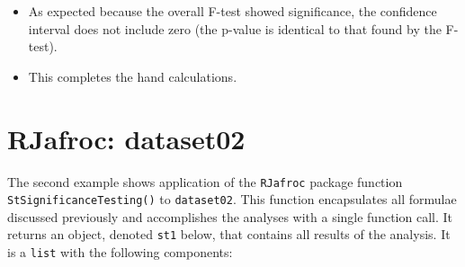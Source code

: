 \documentclass[
]{book}
\providecommand{\tightlist}{%
  \setlength{\itemsep}{0pt}\setlength{\parskip}{0pt}}
\begin{document}
\begin{itemize}
\tightlist
\item
  As expected because the overall F-test showed significance, the confidence interval does not include zero (the p-value is identical to that found by the F-test).
\item
  This completes the hand calculations.
\end{itemize}

\hypertarget{or-applications-dataset02-RJafroc}{%
\section{RJafroc: dataset02}\label{or-applications-dataset02-RJafroc}}

The second example shows application of the \texttt{RJafroc} package function \texttt{StSignificanceTesting()} to \texttt{dataset02}. This function encapsulates all formulae discussed previously and accomplishes the analyses with a single function call. It returns an object, denoted \texttt{st1} below, that contains all results of the analysis. It is a \texttt{list} with the following components:
\end{document}
